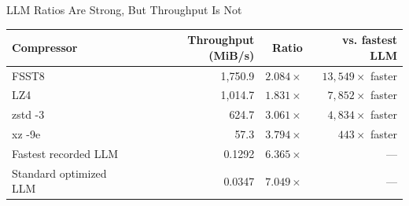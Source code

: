 





\begin{frame}{LLM Ratios Are Strong, But Throughput Is Not}
  \small
  \begin{tabularx}{\textwidth}{Xrrr}
    \toprule
    \textbf{Compressor} & \textbf{Throughput (MiB/s)} & \textbf{Ratio} & \textbf{vs. fastest LLM} \\
    \midrule
    FSST8 & 1,750.9 & $2.084\times$ & $13{,}549\times$ faster \\
    LZ4 & 1,014.7 & $1.831\times$ & $7{,}852\times$ faster \\
    zstd -3 & 624.7 & $3.061\times$ & $4{,}834\times$ faster \\
    xz -9e & 57.3 & $3.794\times$ & $443\times$ faster \\
    \midrule
    Fastest recorded LLM & 0.1292 & $6.365\times$ & --- \\
    Standard optimized LLM & 0.0347 & $7.049\times$ & --- \\
    \bottomrule
  \end{tabularx}
\end{frame}
